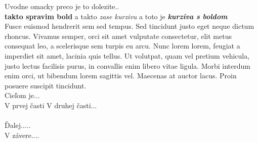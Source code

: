 Uvodne omacky preco je to dolezite.. \\
\textbf{takto spravim bold} a takto \emph{zase kurzivu} a toto je \emph{\textbf{kurziva s boldom}} \\
Fusce euismod hendrerit sem sed tempus. Sed tincidunt justo eget neque dictum rhoncus. Vivamus semper, orci sit amet vulputate consectetur, elit metus consequat leo, a scelerisque sem turpis eu arcu. Nunc lorem lorem, feugiat a imperdiet sit amet, lacinia quis tellus. Ut volutpat, quam vel pretium vehicula, justo lectus facilisis purus, in convallis enim libero vitae ligula. Morbi interdum enim orci, ut bibendum lorem sagittis vel. Maecenas at auctor lacus. Proin posuere suscipit tincidunt. 
\\

Cieľom je...
\\

V prvej časti 
V druhej časti... \\
\\
Ďalej.....  \\
V závere....


